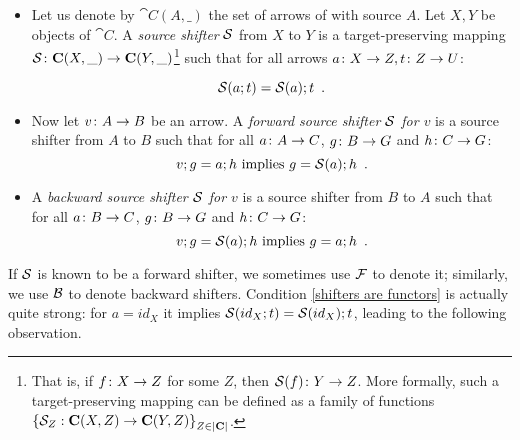 \begin{definition}
\begin{itemize}[topsep=\smallskipamount]
\item Let us denote by $\cat{C}(A,\_)$ the set of arrows of  with source $A$. Let $X,Y$ be objects of $\cat{C}$. A \emph{source shifter} $\mathcal{S}$ from $X$ to $Y$ is a target-preserving mapping $\mathcal{S} \colon \mathbf{C}(X,\_) \rightarrow \mathbf{C}(Y, \_)$\footnote{That is, if $f\colon X \rightarrow Z$ for some $Z$, then $\mathcal{S}(f)\colon Y \rightarrow Z$. More formally, such a target-preserving mapping can be defined as a family of functions $\left\{\mathcal{S}_Z : \mathbf{C}(X, Z) \rightarrow \mathbf{C}(Y, Z)\right\}_{Z\in |\mathbf{C}|}$.} such that for all arrows $a\colon X\rightarrow Z, t\colon Z\rightarrow U$:

%
\begin{equation}\eqlabel{shifters are functors}
\cS(a;t) = \cS(a);t \enspace.
\end{equation}
%
\item Now let $v\colon A\rightarrow B$ be an arrow. A \emph{forward source shifter $\mathcal{S}$ for $v$} is a source shifter from $A$ to $B$ such that for all $a\colon A\rightarrow C$, $g\colon B\rightarrow G$ and $h\colon C\rightarrow G$:
%
\begin{equation}\eqlabel{forward condition}
v;g = a;h \text{ implies } g = \cS(a);h \enspace.
\end{equation}
%
\item A \emph{backward source shifter $\mathcal{S}$ for $v$} is a source shifter from $B$ to $A$ such that for all $a\colon B\rightarrow C$, $g\colon B\rightarrow G$ and $h\colon C\rightarrow G$:
%
\begin{equation}\eqlabel{backward condition}
v;g = \cS(a);h \text{ implies } g = a;h \enspace.
\end{equation}
\end{itemize}
\end{definition}
%
If $\mathcal{S}$ is known to be a forward shifter, we sometimes use $\mathcal{F}$ to denote it; similarly, we use $\mathcal{B}$ to denote backward shifters. 
Condition \eqref{shifters are functors} is actually quite strong: for $a = id_X$ it implies $\mathcal{S}(id_X;t) = \mathcal{S}(id_X);t$,  leading to the following observation.

